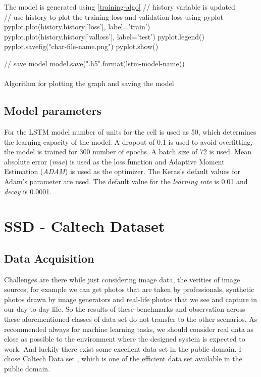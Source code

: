 \begin{algorithm}[H]
\SetAlgoLined
{}
 The model is generated using \ref{training-algo} \;
 // history variable is updated \\
 // use history to plot the training loss and validation loss using pyplot\;
 pyplot.plot(history.history['loss'], label='train')\;
 pyplot.plot(history.history['val\textunderscore loss'], label='test')\;
 pyplot.legend()\;
 pyplot.savefig("char-file-name.png")\;
 pyplot.show()\;

// save model\;
model.save("{}.h5".format(lstm-model-name)) \;
~\\
~\\
 \caption{Algorithm for plotting the graph and saving the model} 
\end{algorithm}

\subsection{Model parameters}
For the LSTM model number of units for the cell is used as 50, which determines the learning capacity of the model. A dropout of 0.1 is used to avoid overfitting, the model is trained for  300 number of epochs. A batch size of 72 is used. Mean absolute error (\textit{mae}) is used as the loss function and Adaptive Moment Estimation (\textit{ADAM}) is used as the optimizer. The Keras's default values for Adam's parameter are used. The default value for the \textit{learning rate} is 0.01 and \textit{decay} is 0.0001. 

\section{SSD - Caltech Dataset}

\subsection{Data Acquisition}
Challenges are there while just considering image data, the verities of image sources, for example we can get photos that are taken by professionals, synthetic photos drawn by image generators and real-life photos that we see and capture in our day to day life. So the results of these benchmarks and 
observation across these aforementioned classes of data set do not transfer to the other scenarios.
As recommended always for machine learning tasks, we should consider real data as close as possible to the environment where the designed system is expected to work. And luckily there exist some excellent data set in the public domain. I chose Caltech Data set \cite{dollar2009pedestrian}, which is one of the efficient data set available in the public domain. 


